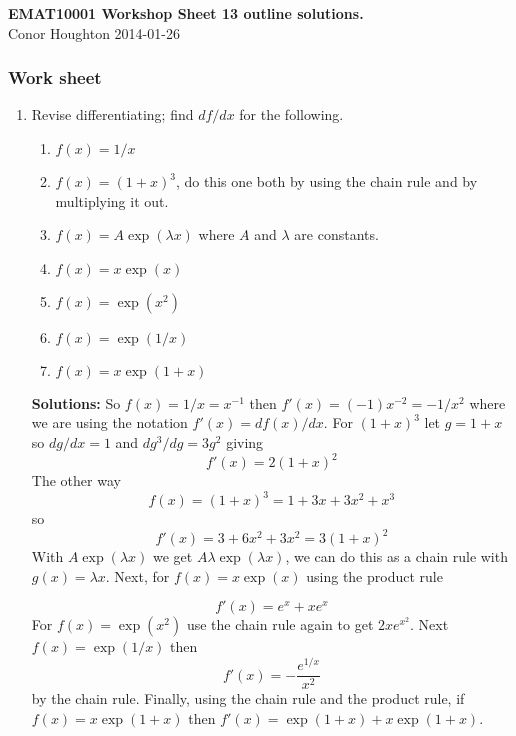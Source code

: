 \documentclass[12pt]{article}
\begin{document}
\begin{center}
{\bf EMAT10001 Workshop Sheet 13 outline solutions.}\\[1cm]{} Conor Houghton 2014-01-26
\end{center}

\subsubsection*{Work sheet}

\begin{enumerate}

\item Revise differentiating; find $df/dx$ for the following.
\begin{enumerate}
\item $f(x)=1/x$
\item $f(x)=(1+x)^3$, do this one both by using the chain rule and by multiplying it out.
\item $f(x)=A\exp(\lambda x)$ where $A$ and $\lambda$ are constants.
\item $f(x)=x\exp(x)$
\item $f(x)=\exp(x^2)$
\item $f(x)=\exp(1/x)$
\item $f(x)=x\exp(1+x)$
\end{enumerate}

\textbf{Solutions: } So $f(x)=1/x=x^{-1}$ then
$f'(x)=(-1)x^{-2}=-1/x^2$ where we are using the notation
$f'(x)=df(x)/dx$. For $(1+x)^3$ let $g=1+x$ so $dg/dx=1$ and
$dg^3/dg=3g^2$ giving
\begin{equation}
f'(x)=2(1+x)^2
\end{equation}
The other way
\begin{equation}
f(x)=(1+x)^3=1+3x+3x^2+x^3
\end{equation}
so
\begin{equation}
f'(x)=3+6x^2+3x^2=3(1+x)^2
\end{equation}
With $A\exp(\lambda x)$ we get $A\lambda \exp(\lambda x)$, we can do
this as a chain rule with $g(x)=\lambda x$. Next, for $f(x)=x\exp(x)$
using the product rule

\begin{equation}
f'(x)=e^x+xe^x
\end{equation}
For $f(x)=\exp(x^2)$ use the chain rule again to get $2xe^{x^2}$. Next $f(x)=\exp(1/x)$ then 
\begin{equation}
f'(x)=-\frac{e^{1/x}}{x^2}
\end{equation}
by the chain rule. Finally, using the chain rule and the product rule, if $f(x)=x\exp(1+x)$ then $f'(x)=\exp(1+x)+x\exp(1+x)$.


\end{enumerate}
\end{document}
